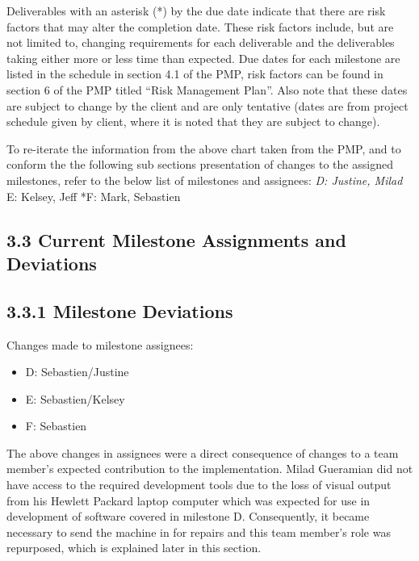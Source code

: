 \documentclass[]{article}
\begin{document}
Deliverables with an asterisk (*) by the due date indicate that there
are risk factors that may alter the completion date. These risk factors
include, but are not limited to, changing requirements for each
deliverable and the deliverables taking either more or less time than
expected. Due dates for each milestone are listed in the schedule in
section 4.1 of the PMP, risk factors can be found in section 6 of the
PMP titled ``Risk Management Plan''. Also note that these dates are
subject to change by the client and are only tentative (dates are from
project schedule given by client, where it is noted that they are
subject to change).

To re-iterate the information from the above chart taken from the PMP,
and to conform the the following sub sections presentation of changes to
the assigned milestones, refer to the below list of milestones and
assignees: \emph{D: Justine, Milad }E: Kelsey, Jeff *F: Mark, Sebastien

\subsection{\textbf{3.3 Current Milestone Assignments and
Deviations}}\label{current-milestone-assignments-and-deviations}

\subsection{\textbf{3.3.1 Milestone
Deviations}}\label{milestone-deviations}

Changes made to milestone assignees:

\begin{itemize}
\itemsep1pt\parskip0pt
\item
  D: Sebastien/Justine
\item
  E: Sebastien/Kelsey
\item
  F: Sebastien
\end{itemize}

The above changes in assignees were a direct consequence of changes to a
team member's expected contribution to the implementation. Milad
Gueramian did not have access to the required development tools due to
the loss of visual output from his Hewlett Packard laptop computer which
was expected for use in development of software covered in milestone D.
Consequently, it became necessary to send the machine in for repairs and
this team member's role was repurposed, which is explained later in this
section.
\end{document}
